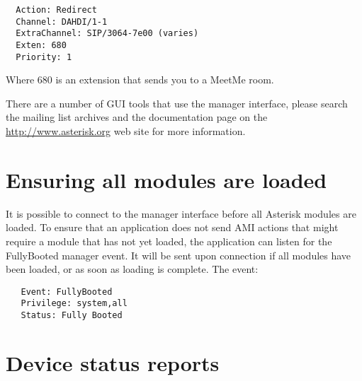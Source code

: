 \begin{verbatim}
  Action: Redirect
  Channel: DAHDI/1-1
  ExtraChannel: SIP/3064-7e00 (varies)
  Exten: 680
  Priority: 1
\end{verbatim}

Where 680 is an extension that sends you to a MeetMe room.

There are a number of GUI tools that use the manager interface, please search
the mailing list archives and the documentation page on the
\url{http://www.asterisk.org} web site for more information.

\section{Ensuring all modules are loaded}
It is possible to connect to the manager interface before all Asterisk modules
are loaded. To ensure that an application does not send AMI actions that might
require a module that has not yet loaded, the application can listen for the
FullyBooted manager event. It will be sent upon connection if all modules have
been loaded, or as soon as loading is complete. The event:

\begin{verbatim}
   Event: FullyBooted
   Privilege: system,all
   Status: Fully Booted
\end{verbatim}

\section{Device status reports}


